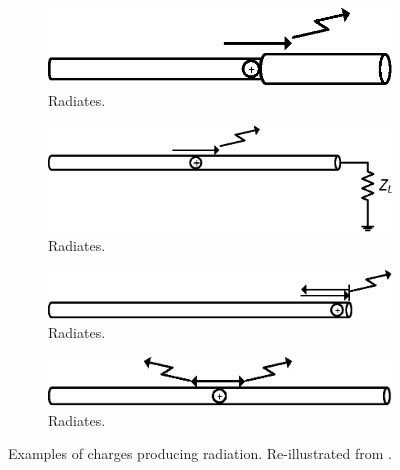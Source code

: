 \begin{figure}[H]
     \begin{subfigure}[b]{0.4\textwidth}
        \includegraphics[width=\textwidth]{img/radiations_discont.eps}
        \caption{Radiates.}
        \label{fig:discont}
    \end{subfigure}
    \begin{subfigure}[b]{0.4\textwidth}
        \includegraphics[width=\textwidth]{img/radiations_terminated.eps}
        \caption{Radiates.}
        \label{fig:terminated}
    \end{subfigure}
    
     \begin{subfigure}[b]{0.4\textwidth}
        \includegraphics[width=\textwidth]{img/radiations_truncated.eps}
        \caption{Radiates.}
        \label{fig:truncated}
    \end{subfigure}
    \begin{subfigure}[b]{0.4\textwidth}
        \includegraphics[width=\textwidth]{img/radiations_osc.eps}
        \caption{Radiates.}
        \label{fig:osc}
    \end{subfigure}
    
    \caption{Examples of charges producing radiation. Re-illustrated from \cite{saunders, balanis}.}
    \label{fig:charges}
\end{figure}

